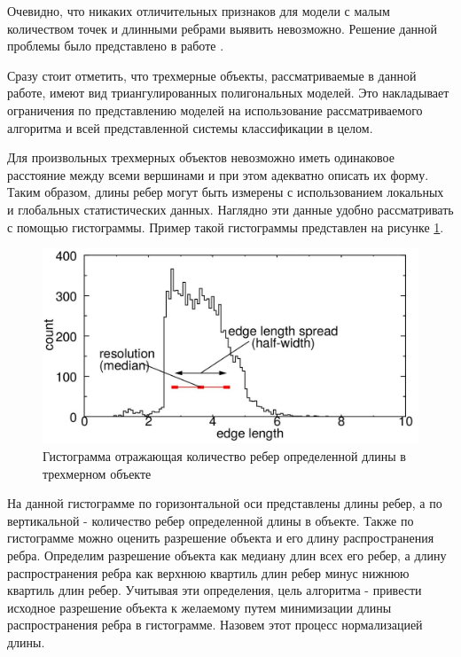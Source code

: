 \documentclass[14pt]{article}
\numberwithin{figure}{section}
\numberwithin{equation}{section}
\begin{document}
Очевидно, что никаких отличительных признаков для модели с малым количеством точек и длинными ребрами выявить невозможно. Решение данной проблемы было представлено в работе \cite{Spin}. %

Сразу стоит отметить, что трехмерные объекты, рассматриваемые в данной работе, имеют вид триангулированных полигональных моделей. Это накладывает ограничения по представлению моделей на использование рассматриваемого алгоритма и всей представленной системы классификации в целом.

Для произвольных трехмерных объектов невозможно иметь одинаковое расстояние между всеми вершинами и при этом адекватно описать их форму. Таким образом, длины ребер могут быть измерены с использованием локальных и глобальных статистических данных. Наглядно эти данные удобно рассматривать с помощью гистограммы. Пример такой гистограммы представлен на рисунке \ref{ris:mc1}.

\begin{figure}[h]
	\begin{center}
		\includegraphics[scale = 0.55]{mc1.JPG}
		\caption{Гистограмма отражающая количество ребер определенной длины в трехмерном объекте}
		\label{ris:mc1}
	\end{center}
\end{figure}

На данной гистограмме по горизонтальной оси представлены длины ребер, а по вертикальной - количество ребер определенной длины в объекте. Также по гистограмме можно оценить разрешение объекта и его длину распространения ребра. Определим разрешение объекта как медиану длин всех его ребер, а длину распространения ребра как верхнюю квартиль длин ребер минус нижнюю квартиль длин ребер. Учитывая эти определения, цель алгоритма - привести исходное разрешение объекта к желаемому путем минимизации длины распространения ребра в гистограмме. Назовем этот процесс нормализацией длины.
\end{document}
